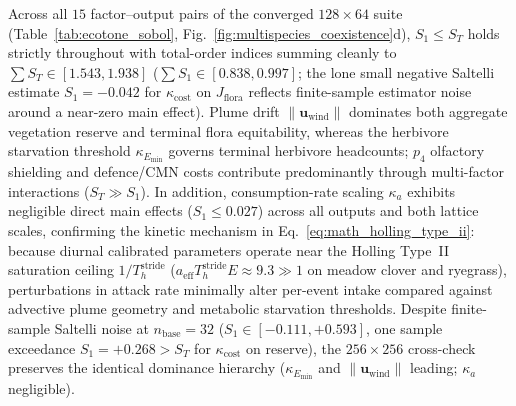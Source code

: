 Across all $15$ factor--output pairs of the converged $128 \times 64$ suite (Table~\ref{tab:ecotone_sobol}, Fig.~\ref{fig:multispecies_coexistence}d), $S_1 \le S_T$ holds strictly throughout with total-order indices summing cleanly to $\sum S_T \in [1.543, 1.938]$ ($\sum S_1 \in [0.838, 0.997]$; the lone small negative Saltelli estimate $S_1 = -0.042$ for $\kappa_{\mathrm{cost}}$ on $J_{\text{flora}}$ reflects finite-sample estimator noise around a near-zero main effect). Plume drift $\|\mathbf{u}_{\text{wind}}\|$ dominates both aggregate vegetation reserve and terminal flora equitability, whereas the herbivore starvation threshold $\kappa_{E_{\min}}$ governs terminal herbivore headcounts; $p_4$ olfactory shielding and defence/CMN costs contribute predominantly through multi-factor interactions ($S_T \gg S_1$). In addition, consumption-rate scaling $\kappa_a$ exhibits negligible direct main effects ($S_1 \le 0.027$) across all outputs and both lattice scales, confirming the kinetic mechanism in Eq.~\eqref{eq:math_holling_type_ii}: because diurnal calibrated parameters operate near the Holling Type~II saturation ceiling $1/T_h^{\mathrm{stride}}$ ($a_{\mathrm{eff}} T_h^{\mathrm{stride}} E \approx 9.3 \gg 1$ on meadow clover and ryegrass), perturbations in attack rate minimally alter per-event intake compared against advective plume geometry and metabolic starvation thresholds. Despite finite-sample Saltelli noise at $n_{\text{base}} = 32$ ($S_1 \in [-0.111, +0.593]$, one sample exceedance $S_1 = +0.268 > S_T$ for $\kappa_{\mathrm{cost}}$ on reserve), the $256 \times 256$ cross-check preserves the identical dominance hierarchy ($\kappa_{E_{\min}}$ and $\|\mathbf{u}_{\text{wind}}\|$ leading; $\kappa_a$ negligible).

